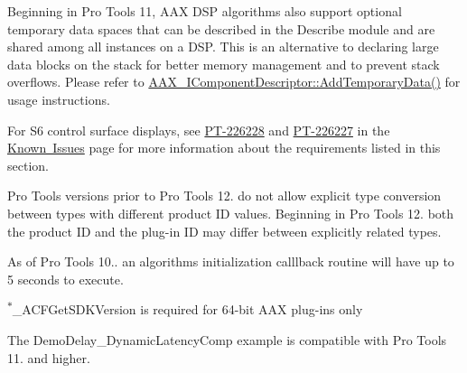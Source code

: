 \begin{DoxyRefList}
\label{a00801__compatibility_notes000024}%
%
 Beginning in Pro Tools 11, AAX DSP algorithms also support optional temporary data spaces that can be described in the Describe module and are shared among all instances on a DSP. This is an alternative to declaring large data blocks on the stack for better memory management and to prevent stack overflows. Please refer to \mbox{\hyperlink{a02069_ad8daad601b60fdbd6134fe0c8faa2fc4}{AAX\+\_\+\+IComponent\+Descriptor\+::\+Add\+Temporary\+Data()}} for usage instructions. 
\item[Module \mbox{\hyperlink{a00827}{Additional\+Features\+\_\+\+Curve\+Displays}} ]\label{a00801__compatibility_notes000001}%
%
 For S6 control surface displays, see \mbox{\hyperlink{a00862_PT-226228}{PT-\/226228}} and \mbox{\hyperlink{a00862_PT-226227}{PT-\/226227}} in the \mbox{\hyperlink{a00862}{Known Issues}} page for more information about the requirements listed in this section. 
\item[Module \mbox{\hyperlink{a00842}{advanced\+Topics\+\_\+related\+Types}} ]\label{a00801__compatibility_notes000020}%
%
 Pro Tools versions prior to Pro Tools 12. do not allow explicit type conversion between types with different product ID values. Beginning in Pro Tools 12. both the product ID and the plug-\/in ID may differ between explicitly related types.

\label{a00801__compatibility_notes000021}%
%
 
\item[Module \mbox{\hyperlink{a00812}{Common\+Interface\+\_\+\+Algorithm}} ]\label{a00801__compatibility_notes000002}%
%
 As of Pro Tools 10.. an algorithm\textquotesingle{}s initialization calllback routine will have up to 5 seconds to execute. 
\item[Module \mbox{\hyperlink{a00816}{Common\+Interface\+\_\+\+Format\+Specification}} ]\label{a00801__compatibility_notes000006}%
%
 \textsuperscript{$\ast$}{\ttfamily \+\_\+\+ACFGet\+SDKVersion} is required for 64-\/bit AAX plug-\/ins only

\label{a00801__compatibility_notes000005}%
%


\label{a00801__compatibility_notes000004}%
%


\label{a00801__compatibility_notes000003}%
%
 
\item[Module \mbox{\hyperlink{a00864}{Example\+Plug\+Ins}} ]\label{a00801__compatibility_notes000022}%
%
 The Demo\+Delay\+\_\+\+Dynamic\+Latency\+Comp example is compatible with Pro Tools 11. and higher.
\end{DoxyRefList}